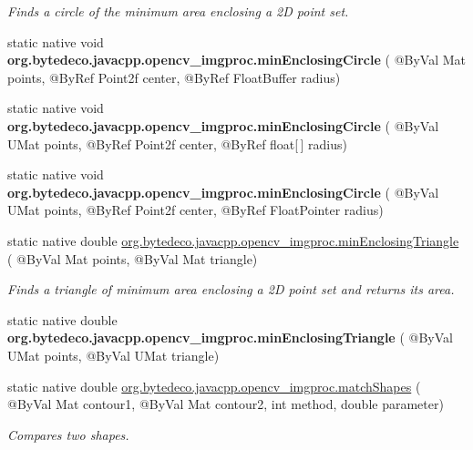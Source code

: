 \begin{DoxyCompactItemize}
\begin{DoxyCompactList}\small\item\em Finds a circle of the minimum area enclosing a 2D point set. \end{DoxyCompactList}\item 
\mbox{\label{group__imgproc__shape_gabdaa1e45e74a5477785134bcfa3ecab3}} 
static native void {\bfseries org.\+bytedeco.\+javacpp.\+opencv\+\_\+imgproc.\+min\+Enclosing\+Circle} ( @By\+Val Mat points, @By\+Ref Point2f center, @By\+Ref Float\+Buffer radius)
\item 
\mbox{\label{group__imgproc__shape_gab36f58950767d263b969b501edac30d8}} 
static native void {\bfseries org.\+bytedeco.\+javacpp.\+opencv\+\_\+imgproc.\+min\+Enclosing\+Circle} ( @By\+Val U\+Mat points, @By\+Ref Point2f center, @By\+Ref float\mbox{[}$\,$\mbox{]} radius)
\item 
\mbox{\label{group__imgproc__shape_ga9b12d377ced761a1de491682b6e98e8b}} 
static native void {\bfseries org.\+bytedeco.\+javacpp.\+opencv\+\_\+imgproc.\+min\+Enclosing\+Circle} ( @By\+Val U\+Mat points, @By\+Ref Point2f center, @By\+Ref Float\+Pointer radius)
\item 
static native double \hyperlink{group__imgproc__shape_ga789d0feac6b1ff1a2d13cfc58fa3e898}{org.\+bytedeco.\+javacpp.\+opencv\+\_\+imgproc.\+min\+Enclosing\+Triangle} ( @By\+Val Mat points, @By\+Val Mat triangle)
\begin{DoxyCompactList}\small\item\em Finds a triangle of minimum area enclosing a 2D point set and returns its area. \end{DoxyCompactList}\item 
\mbox{\label{group__imgproc__shape_ga632c3862bf6f37ac50afb3b2cf530d7e}} 
static native double {\bfseries org.\+bytedeco.\+javacpp.\+opencv\+\_\+imgproc.\+min\+Enclosing\+Triangle} ( @By\+Val U\+Mat points, @By\+Val U\+Mat triangle)
\item 
static native double \hyperlink{group__imgproc__shape_gad14ba9809a9703bef3dbdcd1a487d2fb}{org.\+bytedeco.\+javacpp.\+opencv\+\_\+imgproc.\+match\+Shapes} ( @By\+Val Mat contour1, @By\+Val Mat contour2, int method, double parameter)
\begin{DoxyCompactList}\small\item\em Compares two shapes. \end{DoxyCompactList}\item 

\end{DoxyCompactItemize}
